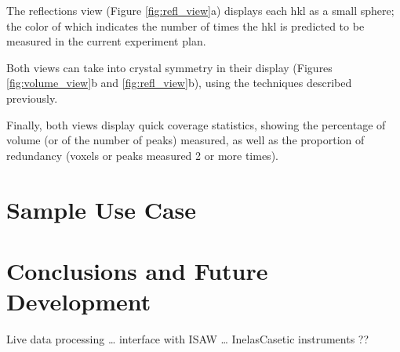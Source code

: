 \documentclass[final]{iucr}              %
\begin{document}
The reflections view (Figure \ref{fig:refl_view}a) displays each hkl as a
small sphere; the color of which indicates the number of times the hkl is predicted to be measured
in the current experiment plan.       

Both views can take into crystal symmetry in their display (Figures
\ref{fig:volume_view}b and \ref{fig:refl_view}b), using the techniques described
previously.
 
Finally, both views display quick coverage statistics, showing the percentage of
volume (or of the number of peaks) measured, as well as the proportion of
redundancy (voxels or peaks measured 2 or more times).     

\section{Sample Use Case}


\section{Conclusions and Future Development}


Live data processing    …  interface with ISAW … InelasCasetic instruments ??























\end{document}
